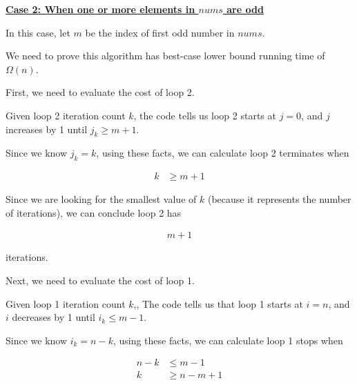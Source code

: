 \documentclass[12pt]{article}
\begin{document}
\begin{enumerate}[a.]
\begin{mdframed}
        \bigskip

        \underline{\textbf{Case 2: When one or more elements in $nums$ are odd}}

        \bigskip

        \color{red}
        In this case, let $m$ be the index of first odd number in $nums$.

        \bigskip

        We need to prove this algorithm has best-case lower bound running time
        of $\Omega(n)$.

        \bigskip

        First, we need to evaluate the cost of loop 2.

        \bigskip

        Given loop 2 iteration count $k$, the code tells us loop 2 starts at $j = 0$,
        and $j$ increases by 1 until $j_k \geq m + 1$.

        \bigskip

        Since we know $j_k = k$, using these facts, we can calculate loop 2 terminates
        when

        \bigskip

        \begin{align}
            k &\geq m + 1
        \end{align}

        \bigskip

        Since we are looking for the smallest value of $k$ (because it represents
        the number of iterations), we can conclude loop 2 has

        \begin{align}
            m + 1
        \end{align}

        iterations.

        \bigskip

        Next, we need to evaluate the cost of loop 1.

        \bigskip

        Given loop 1 iteration count $k$,, The code tells us that loop 1 starts at
        $i = n$, and $i$ decreases by 1 until $i_k \leq m-1$.

        \bigskip

        Since we know $i_k = n - k$, using these facts, we can calculate loop 1 stops
        when

        \begin{align}
            n - k &\leq m - 1\\
            k &\geq n - m +  1
        \end{align}


\end{mdframed}
\end{enumerate}
\end{document}
